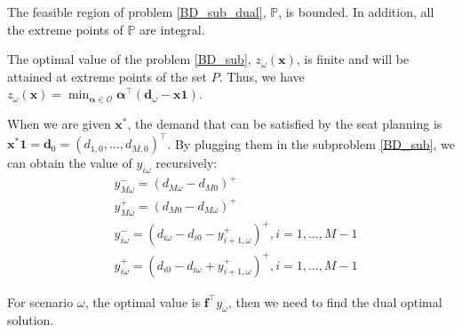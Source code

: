 \begin{prop}\label{feasible_region}
  The feasible region of problem \eqref{BD_sub_dual}, $\mathbb{P}$, is bounded. In addition, all the extreme points of $\mathbb{P}$ are integral.
\end{prop}



\begin{corollary}\label{coro_1}
The optimal value of the problem \eqref{BD_sub}, $z_{\omega}(\mathbf{x})$, is finite and will be attained at extreme points of the set $P$. Thus, we have $z_{\omega}(\mathbf{x}) = \min_{\bm{\alpha} \in \mathcal{O}} \bm{\alpha}^{\intercal}(\mathbf{d}_{\omega}- \mathbf{x} \mathbf{1})$. 
\end{corollary}


When we are given $\mathbf{x}^{*}$, the demand that can be satisfied by the seat planning is $\mathbf{x}^{*} \mathbf{1} = \mathbf{d}_0 = (d_{1,0},\ldots,d_{M,0})^{\intercal}$.
By plugging them in the subproblem \eqref{BD_sub}, we can obtain the value of $y_{i \omega}$ recursively:
\begin{equation}\label{y_recursively}
\begin{aligned}
  & y_{M \omega}^{-}=\left(d_{M \omega}-d_{M 0}\right)^{+} \\
  & y_{M \omega}^{+}=\left(d_{M 0}-d_{M \omega}\right)^{+} \\
  & y_{i \omega}^{-}=\left(d_{i \omega}-d_{i 0} - y_{i+1, \omega}^{+} \right)^{+}, i =1,\ldots, M-1 \\
  & y_{i \omega}^{+}=\left(d_{i 0}- d_{i \omega} + y_{i+1, \omega}^{+}\right)^{+}, i =1,\ldots, M-1
\end{aligned}
\end{equation}

For scenario $\omega$, the optimal value is $\mathbf{f}^{\intercal} y_{\omega}$, then we need to find the dual optimal solution.

